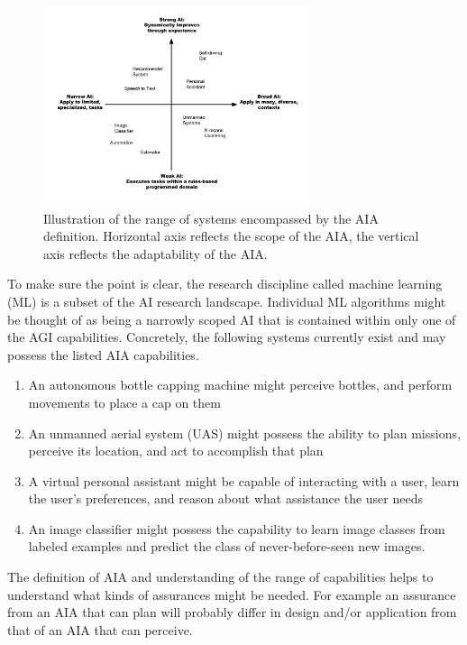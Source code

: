 	\begin{figure}[htbp]
    	\centering
     	\includegraphics[width=0.7\textwidth]{Figures/strong_weak_narrow_broad.pdf}
    	\caption{Illustration of the range of systems encompassed by the AIA definition. Horizontal axis reflects the scope of the AIA, the vertical axis reflects the adaptability of the AIA.}
        \label{fig:StrongWeak}
    \end{figure}

    To make sure the point is clear, the research discipline called machine learning (ML) is a subset of the AI research landscape. Individual ML algorithms might be thought of as being a narrowly scoped AI that is contained within only one of the AGI capabilities. Concretely, the following systems currently exist and may possess the listed AIA capabilities.
    
    \begin{enumerate}
         \item An autonomous bottle capping machine might perceive bottles, and perform movements to place a cap on them
         \item An unmanned aerial system (UAS) might possess the ability to plan missions, perceive its location, and act to accomplish that plan
         \item A virtual personal assistant might be capable of interacting with a user, learn the user's preferences, and reason about what assistance the user needs
         \item An image classifier might possess the capability to learn image classes from labeled examples and predict the class of never-before-seen new images.
     \end{enumerate}

     The definition of AIA and understanding of the range of capabilities helps to understand what kinds of assurances might be needed. For example an assurance from an AIA that can plan will probably differ in design and/or application from that of an AIA that can perceive.

